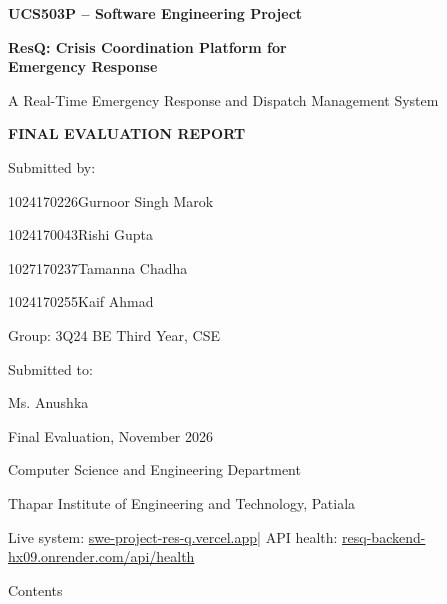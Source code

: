 \documentclass[11pt,a4paper]{article}
\begin{document}
\thispagestyle{empty}
\vspace*{0.65in}
\begin{center}
{\fontsize{18}{22}\selectfont\bfseries UCS503P -- Software Engineering Project\par}
\vspace{0.22in}
{\fontsize{25}{30}\selectfont\bfseries ResQ: Crisis Coordination Platform for\\
Emergency Response\par}
\vspace{0.14in}
{\fontsize{14}{17}\selectfont A Real-Time Emergency Response and Dispatch Management System\par}

\vspace{0.45in}
{\fontsize{14}{17}\selectfont\bfseries FINAL EVALUATION REPORT\par}

\vspace{0.30in}
{\fontsize{12}{15}\selectfont
Submitted by:\par
\vspace{0.08in}
1024170226\quad Gurnoor Singh Marok\par
1024170043\quad Rishi Gupta\par
1027170237\quad Tamanna Chadha\par
1024170255\quad Kaif Ahmad\par
\vspace{0.08in}
Group: 3Q24 BE Third Year, CSE\par
\vspace{0.25in}
Submitted to:\par
Ms. Anushka\par
Final Evaluation, November 2026\par
Computer Science and Engineering Department\par
Thapar Institute of Engineering and Technology, Patiala\par
}
\vspace{0.3in}
{\small Live system: \href{https://swe-project-res-q.vercel.app}{swe-project-res-q.vercel.app}\quad|\quad
API health: \href{https://resq-backend-hx09.onrender.com/api/health}{resq-backend-hx09.onrender.com/api/health}\par}
\end{center}

\newpage

\thispagestyle{empty}
{\fontsize{22}{26}\selectfont Contents\par}
\vspace{8pt}
\end{document}
